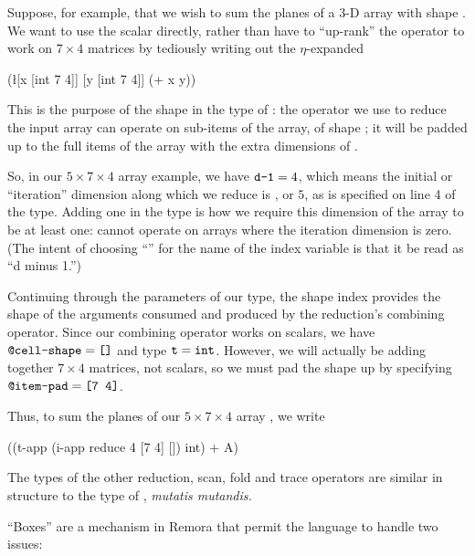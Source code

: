 Suppose, for example, that we wish to sum the planes of 
a 3-D array  with shape \ex{[5 7 4]}.
We want to use the scalar \ex{+} directly,
rather than have to ``up-rank'' the operator to work on 
$7 \times 4$ matrices by tediously writing out the $\eta$-expanded
\begin{code}
(\l{[x [int 7 4]] [y [int 7 4]]}
  (+ x y))\end{code}
This is the purpose of the  shape in the type of
: 
the operator we use to reduce the input array can operate
on sub-items of the array, of shape ;
it will be padded up to the full items of the array with the
extra dimensions of .

So, in our $5 \times 7 \times 4$ array example, 
we have $\ex{d-1} = 4$, 
which means the initial or ``iteration'' dimension
along which we reduce is , or $5$,
as is specified on line 4 of the type.
Adding one in the type is how we require this dimension of the array
to be at least one: 
 cannot operate on arrays where 
the iteration dimension is zero.
(The intent of choosing ``'' for the name of the index variable 
is that it be read as ``d minus 1.'')

Continuing through the parameters of our type,
the shape index  provides the shape of the
arguments consumed and produced by the reduction's combining operator.
Since our combining operator \ex{+} works on scalars,
we have $\ex{@cell-shape} = \ex{[]}$ and type $\ex{t} = \ex{int}$.
However, we will actually be adding together $7 \times 4$ matrices,
not scalars, so we must pad the shape up by specifying 
$\ex{@item-pad} = \ex{[7 4]}$.

Thus, to sum the planes of our $5 \times 7 \times 4$ array , 
we write
\begin{code}
((t-app (i-app reduce 4 [7 4] []) int) + A)\end{code}

The types of the other reduction, scan, fold and trace operators are
similar in structure to the type of ,
\emph{mutatis mutandis.}
\label{sec:boxes}

``Boxes'' are a mechanism in Remora that permit the language
to handle two issues:

